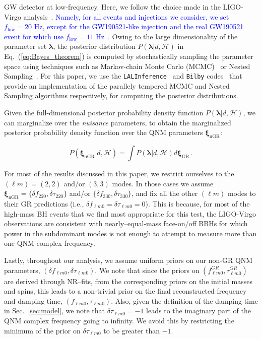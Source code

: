 \documentclass[twocolumn,prd,aps,superscriptaddress,preprintnumbers,tightenlines,showpacs,nofootinbib,eqsecnum,amsfonts,amsmath]{revtex4-1}
\newcommand{\blambda}{\bm{\lambda}}
\newcommand{\bxigr}{\bm{\xi}_{\text{GR}}}
\newcommand{\bxingr}{\bm{\xi}_{\text{nGR}}}
\newcommand{\df}[1]{\delta f_{\text{#1}}}
\newcommand{\dtau}[1]{\delta \tau_{\text{#1}}}
\begin{document}
GW detector at low-frequency. Here, we follow the choice made in the LIGO-Virgo analysis~\cite{LIGOScientific:2018mvr,Abbott:2020niy}. \textcolor{blue}{Namely, for all events and injections we consider, we set ${f_\mathrm{low}}=20$ Hz, except for the GW190521-like injection and the real GW190521 event for which use ${f_\mathrm{low}}=11$ Hz~\cite{Abbott:2020tfl,Abbott:2020mjq}.} Owing to the large dimensionality of the parameter set $\blambda$, the posterior distribution $P(\blambda | d, \mathcal{H})$ in Eq.~(\ref{eq:Bayes_theorem}) is computed by stochastically sampling the parameter space using techniques such as Markov-chain Monte Carlo (MCMC)~\cite{Metropolis:1953am,Hastings:1970aa} or Nested Sampling~\cite{Skilling:2006gxv}. For this paper, we use the \verb+LALInference+~\cite{Veitch:2014wba} and \verb+Bilby+ codes~\cite{Ashton:2018jfp,Smith:2019ucc,Speagle_2020} that provide an implementation of the parallely tempered MCMC and Nested Sampling algorithms respectively, for computing the posterior distributions.

Given the full-dimensional posterior probability density function $P(\blambda | d, \mathcal{H})$, we can marginalize over the \emph{nuisance} parameters, to obtain the marginalized posterior probability density function over the QNM parameters $\bxingr$:

\begin{equation}
P(\bxingr | d, \mathcal{H})= \int P(\blambda | d, \mathcal{H}) d\bxigr\,.
\end{equation}

For most of the results discussed in this paper, we restrict ourselves
to the $(\ell m) = (2,2)$ and/or $(3,3)$ modes. In those cases we assume $\bxingr = \{\df{220},\dtau{220}\}$ and/or $
\{\df{330},\dtau{330}\}$, and fix all the other $(\ell m)$ modes to their GR predictions (i.e., $\delta f_{\ell m 0} = \delta
\tau_{\ell m 0} = 0$). This is because, for most of the high-mass BH
events that we find most appropriate for this test, the LIGO-Virgo
observations are consistent with nearly--equal-mass face-on/off BBHs
for which power in the subdominant modes is not enough to
attempt to measure more than one QNM complex frequency.

Lastly, throughout our analysis, we assume uniform priors on our non-GR QNM
parameters, $(\delta f_{\ell m 0},\delta \tau_{\ell m 0})$. We note that
since the priors on $( f_{\ell m 0}^{GR},\tau_{\ell m 0}^{GR})$ are
derived through NR--fits, from the corresponding priors on the initial
masses and spins, this leads to a non-trivial prior on the final
reconstructed frequency and damping time, $( f_{\ell m 0},\tau_{\ell m
  0})$. Also, given the definition of the damping time in
Sec.~\ref{sec:model}, we note that $\delta \tau_{\ell m 0} = -1$ leads
to the imaginary part of the QNM complex frequency going to infinity. We avoid
this by restricting the minimum of the prior on $\delta \tau_{\ell m
  0}$ to be greater than $-1$.
\end{document}
